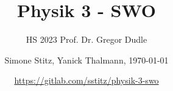 \documentclass[8pt, a4paper, fleqn, landscape]{scrartcl}
\title{Physik 3 - SWO}
\subtitle{HS 2023 Prof. Dr. Gregor Dudle}
\author{Simone Stitz, Yanick Thalmann, \today}
\date{{\small \url{https://gitlab.com/sstitz/physik-3-swo}}}
\begin{document}
	\begin{multicols*}{3}
		\maketitle
		\raggedcolumns%
	
		
		
		
		
	
	\end{multicols*}	
\end{document}
